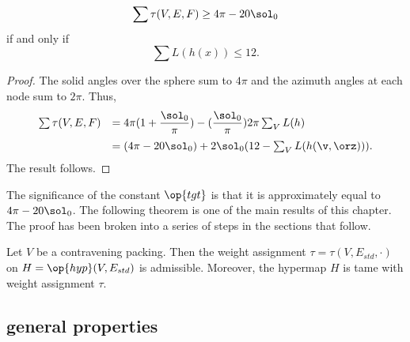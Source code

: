 \begin{lemma}[]
\begin{displaymath}
\sum \tau (V,E,F) \ge 4\pi - 20\sol_0
\end{displaymath}
if and only if
\begin{displaymath}
\sum L(h(x)) \le 12.
\end{displaymath}
\end{lemma}

\begin{proof}
  The solid angles over the sphere sum to $4\pi$ and the azimuth
  angles at each node sum to $2\pi$.
Thus,
\begin{equation}\label{eqn:delta0}
\begin{array}{lll}
  \sum \tau (V,E,F) 
  &= 4\pi (1 + \dfrac{\sol_0}{\pi}) 
- (\dfrac{\sol_0}{\pi}) 2\pi \sum_{V} L(h)\vspace{6pt}\\
&= (4\pi - 20\sol_0) + 2\sol_0 (12 - \sum_V L(h(\v,\orz))).
\end{array}
\end{equation}
The result follows.
\end{proof}

The significance of the constant $\op{tgt}$ is that it is
approximately equal to $4\pi - 20\sol_0$.
%
The following theorem is one of the main results of this chapter.  The
proof has been broken into a series of steps in the sections that
follow.

\begin{theorem} \label{theorem:contravene}
  Let $V$ be a contravening packing.  Then the weight assignment
  $\tau=\tau(V,E_{std},\cdot)$ on $H=\op{hyp}(V,E_{std})$ is
  admissible.  Moreover, the hypermap $H$ is tame with weight
  assignment $\tau$.
\end{theorem}
%
%
%



\subsection{general properties}
\label{sec:startame}


